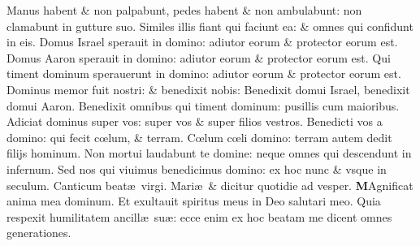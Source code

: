 \documentclass[a5paper,10pt]{book}
\def\leftmarginnote{%
	\lrmarginnote{\hskip -\marginparsep \hskip -6.5em}}
\def\ae{æ}
\def\oe{œ}
\begin{document}
\begin{multicols*}{2}
\newline \color{red} M\color{black}anus habent \& non palpabunt, pedes habent \& non ambulabunt: non clamabunt in gutture suo.
\newline \color{red} S\color{black}imiles illis fiant qui faciunt ea: \& omnes qui confidunt in eis.
\newline \color{red} D\color{black}omus Israel sperauit in domino: adiutor eorum \& protector eorum est.
\newline \color{red} D\color{black}omus Aaron sperauit in domino: adiutor eorum \& protector eorum est.
\newline \color{red} Q\color{black}ui timent dominum sperauerunt in domino: adiutor eorum \& protector eorum est.
\newline \color{red} D\color{black}ominus memor fuit nostri: \& benedixit nobis:
\newline \color{red} B\color{black}enedixit domui Israel, benedixit domui Aaron.
\newline \color{red} B\color{black}enedixit omnibus qui timent dominum: pusillis cum maioribus.
\newline \color{red} A\color{black}diciat dominus super vos: super vos \& super filios vestros.
\newline \color{red} B\color{black}enedicti vos a domino: qui fecit c\oe lum, \& terram.
\newline \color{red} C\color{black}\oe lum c\oe li domino: terram autem dedit filijs hominum.
\newline \color{red} N\color{black}on mortui laudabunt te domine: neque omnes qui descendunt in infernum.
\newline \color{red} S\color{black}ed nos qui viuimus benedicimus domino: ex hoc nunc \& vsque in seculum.
\newline \color{red} \hypertarget{Magnificat}{Canticum} beat\ae \ virgi. Mari\ae \ \& dicitur quotidie ad vesper. \color{black}
\lettrine[lines=2]{\bfseries \color{red} M}{}Agnificat anima mea dominum.\leftmarginnote{\begin{flushright}Lu.\\1.\end{flushright}}
\newline \linebreak
\noindent \color{red} E\color{black}t exultauit spiritus meus in Deo salutari meo.
\newline \color{red} Q\color{black}uia respexit humilitatem ancill\ae \ su\ae : ecce enim ex hoc beatam me dicent omnes generationes.

\end{multicols*}
\end{document}
